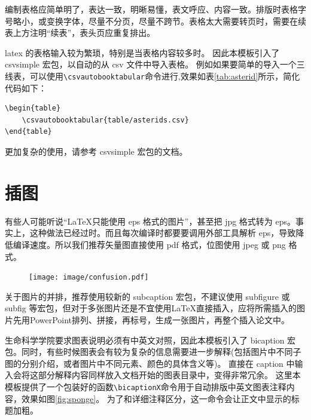 编制表格应简单明了，表达一致，明晰易懂，表文呼应、内容一致。排版时表格字号略小，或变换字体，尽量不分页，尽量不跨节。表格太大需要转页时，需要在续表上方注明“续表”，表头页应重复排出。

latex 的表格输入较为繁琐，特别是当表格内容较多时。
因此本模板引入了 csvsimple 宏包，以自动的从 csv 文件中导入表格。
例如如果要简单的导入一个三线表，可以使用\verb|\csvautobooktabular|命令进行,效果如表\ref{tab:asterid}所示，简化代码如下：
\begin{verbatim}
\begin{table}
	\csvautobooktabular{table/asterids.csv}
\end{table}
\end{verbatim}

\begin{table}
	\centering
	\begin{adjustbox}{max width=\linewidth}
	\end{adjustbox}
	\label{tab:asterid}
\end{table}

更加复杂的使用，请参考 csvsimple 宏包的文档。

\section{插图}
\label{sec:figure}
有些人可能听说“\LaTeX 只能使用 eps 格式的图片”，甚至把 jpg 格式转为 eps。事实上，这种做法已经过时。而且每次编译时都要要调用外部工具解析 eps，导致降低编译速度。所以我们推荐矢量图直接使用 pdf 格式，位图使用 jpeg 或 png 格式。
\begin{figure}[h] 
	\centering
	\texttt{[image: image/confusion.pdf]}
	\label{fig:confusion}
\end{figure}

关于图片的并排，推荐使用较新的 subcaption 宏包，不建议使用 subfigure 或 subfig 等宏包，但对于多张图片还是不宜使用\LaTeX 直接插入，应将所需插入的图片先用PowerPoint排列、拼接，再标号，生成一张图片，再整个插入论文中。

生命科学学院要求图表说明必须有中英文对照，因此本模板引入了 bicaption 宏包。同时，有些时候图表会有较为复杂的信息需要进一步解释(包括图片中不同子图的分别介绍，或者图片中不同元素、颜色的具体含义等)。
直接在 caption 中输入会将这部分解释内容同样放入文档开始的图表目录中，变得非常冗余。
这里本模板提供了一个包装好的函数\verb|\bicaptionX|命令用于自动排版中英文图表注释内容，效果如图\ref{fig:sponge}。
为了和详细注释区分，这一命令会让正文中显示的标题加粗。

